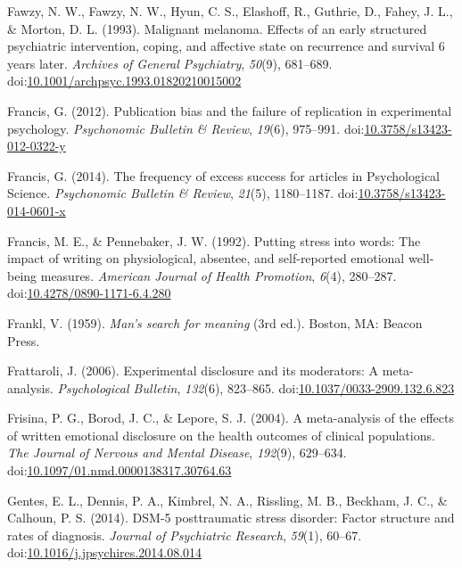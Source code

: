\documentclass[english,man, mask]{apa6}
\theoremstyle{definition}
\theoremstyle{definition}
\theoremstyle{definition}
\theoremstyle{remark}
\begin{document}
\hypertarget{ref-Fawzy1993}{}
Fawzy, N. W., Fawzy, N. W., Hyun, C. S., Elashoff, R., Guthrie, D.,
Fahey, J. L., \& Morton, D. L. (1993). Malignant melanoma. Effects of an
early structured psychiatric intervention, coping, and affective state
on recurrence and survival 6 years later. \emph{Archives of General
Psychiatry}, \emph{50}(9), 681--689.
doi:\href{https://doi.org/10.1001/archpsyc.1993.01820210015002}{10.1001/archpsyc.1993.01820210015002}

\hypertarget{ref-Francis2012}{}
Francis, G. (2012). Publication bias and the failure of replication in
experimental psychology. \emph{Psychonomic Bulletin \& Review},
\emph{19}(6), 975--991.
doi:\href{https://doi.org/10.3758/s13423-012-0322-y}{10.3758/s13423-012-0322-y}

\hypertarget{ref-Francis2014}{}
Francis, G. (2014). The frequency of excess success for articles in
Psychological Science. \emph{Psychonomic Bulletin \& Review},
\emph{21}(5), 1180--1187.
doi:\href{https://doi.org/10.3758/s13423-014-0601-x}{10.3758/s13423-014-0601-x}

\hypertarget{ref-Francis1992}{}
Francis, M. E., \& Pennebaker, J. W. (1992). Putting stress into words:
The impact of writing on physiological, absentee, and self-reported
emotional well-being measures. \emph{American Journal of Health
Promotion}, \emph{6}(4), 280--287.
doi:\href{https://doi.org/10.4278/0890-1171-6.4.280}{10.4278/0890-1171-6.4.280}

\hypertarget{ref-Frankl1959}{}
Frankl, V. (1959). \emph{Man's search for meaning} (3rd ed.). Boston,
MA: Beacon Press.

\hypertarget{ref-Frattaroli2006}{}
Frattaroli, J. (2006). Experimental disclosure and its moderators: A
meta-analysis. \emph{Psychological Bulletin}, \emph{132}(6), 823--865.
doi:\href{https://doi.org/10.1037/0033-2909.132.6.823}{10.1037/0033-2909.132.6.823}

\hypertarget{ref-Frisina2004a}{}
Frisina, P. G., Borod, J. C., \& Lepore, S. J. (2004). A meta-analysis
of the effects of written emotional disclosure on the health outcomes of
clinical populations. \emph{The Journal of Nervous and Mental Disease},
\emph{192}(9), 629--634.
doi:\href{https://doi.org/10.1097/01.nmd.0000138317.30764.63}{10.1097/01.nmd.0000138317.30764.63}

\hypertarget{ref-Gentes2014}{}
Gentes, E. L., Dennis, P. A., Kimbrel, N. A., Rissling, M. B., Beckham,
J. C., \& Calhoun, P. S. (2014). DSM-5 posttraumatic stress disorder:
Factor structure and rates of diagnosis. \emph{Journal of Psychiatric
Research}, \emph{59}(1), 60--67.
doi:\href{https://doi.org/10.1016/j.jpsychires.2014.08.014}{10.1016/j.jpsychires.2014.08.014}
\end{document}
